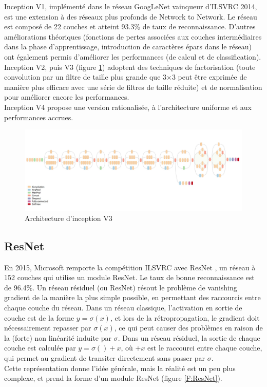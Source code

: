 \documentclass{DocBleu}
\begin{document}
Inception V1, implémenté dans le réseau GoogLeNet vainqueur d'ILSVRC 2014, est une extension à des réseaux plus profonds de Network to Network. Le réseau est composé de 22 couches et atteint 93.3\% de taux de reconnaissance. D'autres améliorations théoriques (fonctions de pertes associées aux couches intermédiaires dans la phase d'apprentissage, introduction de caractères épars dans le réseau) ont également permis d'améliorer les performances (de calcul et de classification).\\
Inception V2, puis V3 (figure  \ref{F:iv3}) adoptent des techniques de factorisation (toute convolution par un filtre de taille plus grande que 3$\times$3 peut être exprimée de manière plus efficace avec une série de filtres de taille réduite) et de normalisation pour améliorer encore les performances.\\
Inception V4 \cite{Szegedy16} propose une version rationalisée, à l'architecture uniforme et aux performances accrues.

\begin{figure}[hbtp!]
\centering
\includegraphics[width=\columnwidth]{images/inceptionv3.png}
\caption{Architecture d'inception V3}
\label{F:iv3}
\end{figure}

\subsection{ResNet}
En 2015, Microsoft remporte la compétition ILSVRC avec ResNet \cite{He15}, un réseau à 152 couches qui utilise un module ResNet. Le taux de bonne reconnaissance est de 96.4\%.  Un réseau résiduel (ou ResNet) résout le problème de vanishing gradient de la manière la plus simple possible, en permettant des raccourcis entre chaque couche du réseau. Dans un réseau classique, l'activation en sortie de couche est de la forme $y=\sigma(x)$, et lors de la rétropropagation, le gradient doit nécessairement repasser par $\sigma(x)$, ce qui peut causer des problèmes en raison de la (forte) non linéarité induite par $\sigma$. Dans un réseau résiduel, la sortie de chaque couche est calculée par $y=\sigma()+x$, où $+x$ est le raccourci entre chaque couche, qui permet au gradient de transiter directement sans passer par $\sigma$. \\
Cette représentation donne l'idée générale, mais la réalité est un peu plus complexe, et prend la forme d'un module ResNet (figure \ref{F:ResNet}).
\end{document}
